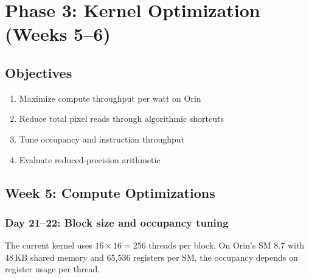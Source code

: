 \documentclass[11pt,letterpaper]{article}
\begin{document}
\section{Phase 3: Kernel Optimization (Weeks 5--6)}
\label{sec:phase3}

\subsection{Objectives}

\begin{enumerate}[leftmargin=2em]
    \item Maximize compute throughput per watt on Orin
    \item Reduce total pixel reads through algorithmic shortcuts
    \item Tune occupancy and instruction throughput
    \item Evaluate reduced-precision arithmetic
\end{enumerate}

\subsection{Week 5: Compute Optimizations}

\subsubsection{Day 21--22: Block size and occupancy tuning}

The current kernel uses $16 \times 16 = 256$ threads per block. On Orin's
SM 8.7 with 48\,KB shared memory and 65,536 registers per SM, the
occupancy depends on register usage per thread.
\end{document}
